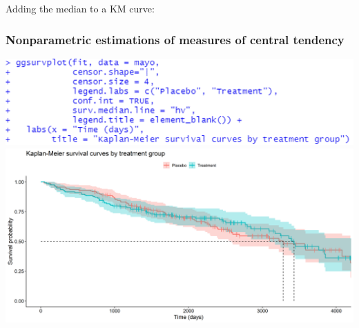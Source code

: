 \documentclass[10pt,t]{beamer}
\begin{document}
\begin{frame}
	\vspace{-0.5cm}
	Adding the median to a KM curve:
	\frametitle{Nonparametric estimations of measures of central tendency} 
	\begin{center}
		\includegraphics[height=0.3\textheight]{figs/KM_strat_medians_code.png}
		\includegraphics[width=\textwidth]{figs/KM_strat_medians.png}
	\end{center}
\end{frame}

%
%
\end{document}
